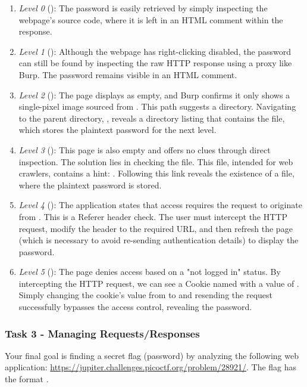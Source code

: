 \begin{enumerate}
    \item \textit{Level 0} (): The password is easily retrieved by simply inspecting the webpage's source code, where it is left in an HTML comment within the response.
    \item \textit{Level 1} (): Although the webpage has right-clicking disabled, the password can still be found by inspecting the raw HTTP response using a proxy like Burp. The password remains visible in an HTML comment.
    \item \textit{Level 2} (): The page displays as empty, and Burp confirms it only shows a single-pixel image sourced from . This path suggests a directory. Navigating to the parent directory, , reveals a directory listing that contains the  file, which stores the plaintext password for the next level.
    \item \textit{Level 3} (): This page is also empty and offers no clues through direct inspection. The solution lies in checking the  file. This file, intended for web crawlers, contains a hint: . Following this link reveals the existence of a  file, where the plaintext password is stored.
    \item \textit{Level 4} (): The application states that access requires the request to originate from . This is a Referer header check. The user must intercept the HTTP request, modify the  header to the required URL, and then refresh the page (which is necessary to avoid re-sending authentication details) to display the password.
    \item \textit{Level 5} (): The page denies access based on a "not logged in" status. By intercepting the HTTP request, we can see a Cookie named  with a value of . Simply changing the cookie's value from  to  and resending the request successfully bypasses the access control, revealing the password.
\end{enumerate}

\subsubsection{Task 3 - Managing Requests/Responses}
Your final goal is finding a secret flag (password) by analyzing the following web application: \url{https://jupiter.challenges.picoctf.org/problem/28921/}. The flag has the format .

